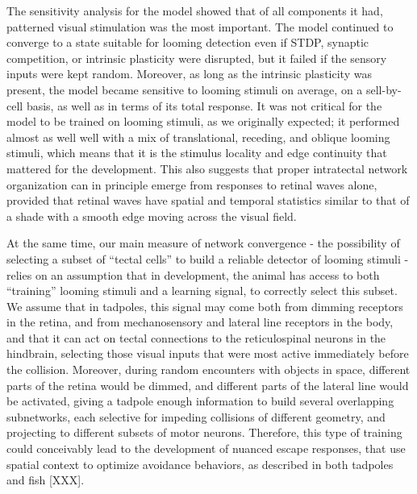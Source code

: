 \documentclass{article}
\begin{document}
The sensitivity analysis for the model showed that of all components it had, patterned visual stimulation was the most important. The model continued to converge to a state suitable for looming detection even if STDP, synaptic competition, or intrinsic plasticity were disrupted, but it failed if the sensory inputs were kept random. Moreover, as long as the intrinsic plasticity was present, the model became sensitive to looming stimuli on average, on a sell-by-cell basis, as well as in terms of its total response. It was not critical for the model to be trained on looming stimuli, as we originally expected; it performed almost as well well with a mix of translational, receding, and oblique looming stimuli, which means that it is the stimulus locality and edge continuity that mattered for the development. This also suggests that proper intratectal network organization can in principle emerge from responses to retinal waves alone, provided that retinal waves have spatial and temporal statistics similar to that of a shade with a smooth edge moving across the visual field.

At the same time, our main measure of network convergence - the possibility of selecting a subset of “tectal cells” to build a reliable detector of looming stimuli - relies on an assumption that in development, the animal has access to both “training” looming stimuli and a learning signal, to correctly select this subset. We assume that in tadpoles, this signal may come both from dimming receptors in the retina, and from mechanosensory and lateral line receptors in the body, and that it can act on tectal connections to the reticulospinal neurons in the hindbrain, selecting those visual inputs that were most active immediately before the collision. Moreover, during random encounters with objects in space, different parts of the retina would be dimmed, and different parts of the lateral line would be activated, giving a tadpole enough information to build several overlapping subnetworks, each selective for impeding collisions of different geometry, and projecting to different subsets of motor neurons. Therefore, this type of training could conceivably lead to the development of nuanced escape responses, that use spatial context to optimize avoidance behaviors, as described in both tadpoles \citep{khakhalin2014} and fish [XXX].
\end{document}
